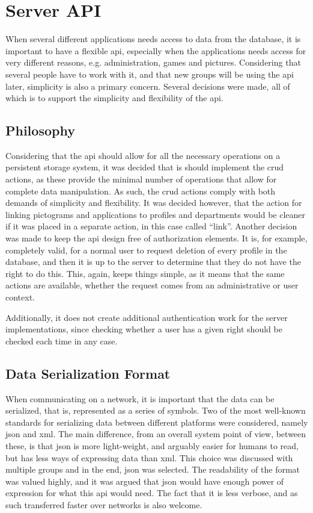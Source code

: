 \section{Server API}

When several different applications needs access to data from the database, it is important to have a flexible \ac{api}, especially when 
the applications needs access for very different reasons, e.g. administration, games and pictures. Considering that several people have to
work with it, and that new groups will be using the \ac{api} later, simplicity is also a primary concern. Several decisions were made, all of
which is to support the simplicity and flexibility of the \ac{api}.

\subsection{Philosophy}

Considering that the \ac{api} should allow for all the necessary operations on a persistent storage system, it was decided that is should
implement the \ac{crud} actions, as these provide the minimal number of operations that allow for complete data manipulation. \citep{crud13}
As such, the \ac{crud} actions comply with both demands of simplicity and flexibility. It was decided however, that the action for linking pictograms
and applications to profiles and departments would be cleaner if it was placed in a separate action, in this case called ``link''.\p
Another decision was made to keep the \ac{api} design free of authorization elements. It is, for example, completely valid, for a normal user
to request deletion of every profile in the database, and then it is up to the server to determine that they do not have the right to do this.
This, again, keeps things simple, as it means that the same actions are available, whether the request comes from an administrative or
user context.

Additionally, it does not create additional authentication work for the server implementations, since checking whether a user has a given right
should be checked each time in any case.

\subsection{Data Serialization Format}

When communicating on a network, it is important that the data can be serialized, that is, represented as a series of symbols. Two of the most
well-known standards for serializing data between different platforms were considered, namely \ac{json} and \ac{xml}. The main difference, from
an overall system point of view, between these, is that \ac{json} is more light-weight, and arguably easier for humans to read, but has less 
ways of expressing data than \ac{xml}.\p
This choice was discussed with multiple groups and in the end, \ac{json} was selected. The readability of the format was valued highly, and it
was argued that \ac{json} would have enough power of expression for what this \ac{api} would need. The fact that it is less verbose, and as such
transferred faster over networks is also welcome.

